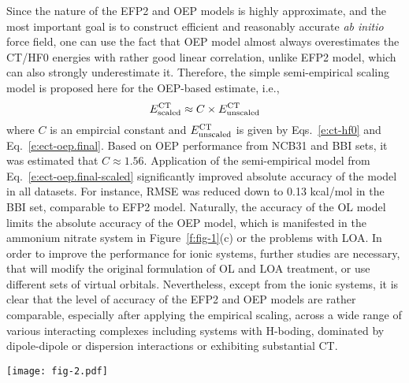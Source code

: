 \documentclass[aip,jcp,amsmath,amssymb,reprint,floatfix]{revtex4-1}
\begin{document}
Since the nature of the EFP2 and OEP models is highly approximate,
and the most important goal is to construct efficient and reasonably
accurate \emph{ab initio} force field, one can use the fact that
OEP model almost always overestimates the CT/HF0 energies
with rather good linear correlation,
unlike EFP2 model, which can also strongly underestimate it.
Therefore, the simple semi\hyp{}empirical scaling model is proposed here
for the OEP\hyp{}based estimate, i.e.,
%
\begin{equation} \label{e:ect-oep.final-scaled}
 E^{\rm CT}_{\rm scaled} \approx C \times E^{\rm CT}_{\rm unscaled}
\end{equation}
%
where $C$ is an empircial constant and $E^{\rm CT}_{\rm unscaled}$ is given by
Eqs.~\eqref{e:ct-hf0} and Eq.~\eqref{e:ect-oep.final}. Based on
OEP performance from NCB31 and BBI sets, it was estimated
that $C\approx 1.56$. Application of the semi\hyp{}empirical model
from Eq.~\eqref{e:ect-oep.final-scaled} significantly improved
absolute accuracy of the model in all datasets. 
For instance, RMSE was reduced down to 0.13 kcal/mol in the BBI set,
comparable to EFP2 model.
Naturally, the accuracy of the OL model limits the absolute accuracy
of the OEP model, which is manifested in the ammonium nitrate system
in Figure~\ref{f:fig-1}(c) or the problems with LOA. 
In order to improve the performance for ionic systems,
further studies are necessary, that will modify the original formulation
of OL and LOA treatment, 
or use different sets of virtual orbitals\cite{Xu.Gordon.JCP.2013}. Nevertheless, except from the ionic systems,
it is clear that the level of accuracy of the EFP2 and OEP models are rather comparable,
especially after applying the empirical scaling,
across a wide range of various interacting complexes including 
systems with H-boding, dominated by dipole-dipole or dispersion interactions or 
exhibiting substantial CT.





%
\begin{figure*}[h]
\texttt{[image: fig-2.pdf]}
\caption{\label{f:fig-2} {\bf Accuracy of the ERI elimination technique.}
(a) NCB31 
database,\cite{Zhao.Schultz.Truhlar.JCTC.2006,
Zhao.Truhlar.JCTC.2005,Zhao.Schultz.Truhlar.JCTC.2006,Zhao.Schultz.Truhlar.JCP.2005} 
and
(b) BBI subset\cite{Burns.Faver.Zheng.Marshall.Smith.Vanommeslaeghe.MacKerell.Merz.Sherrill.JCP.2017} 
from the BioFragment Database.
For the OEP calculations, the EDF-1 scheme with the aug-cc-pVDZ-jkfit auxiliary basis set
was used.
} 
\end{figure*}
%
\end{document}
